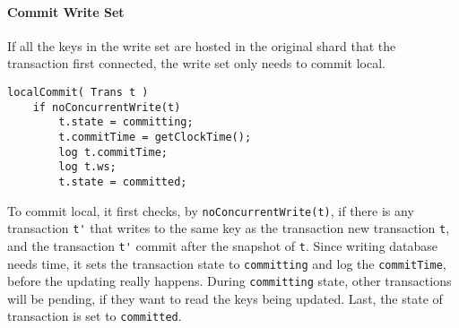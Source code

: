 \paragraph{\bf Commit Write Set}
If all the keys in the write set are hosted in the original shard that the transaction first connected,
the write set only needs to commit local.
\begin{lstlisting}[caption={Local Commit},label={lst:clock-si-local-commit}]
localCommit( Trans t )
    if noConcurrentWrite(t)
        t.state = committing;
        t.commitTime = getClockTime();
        log t.commitTime;
        log t.ws;
        t.state = committed;
\end{lstlisting}
To commit local, it first checks, by \verb|noConcurrentWrite(t)|,
if there is any transaction \verb|t'| 
that writes to the same key as the transaction new transaction \verb|t|,
and the transaction \verb|t'| commit after the snapshot of \verb|t|.
Since writing database needs time,
it sets the transaction state to \verb|committing| and
log the \verb|commitTime|, before the updating really happens.
During \verb|committing| state, other transactions will be pending, 
if they want to read the keys being updated.
Last, the state of transaction is set to \verb|committed|.

